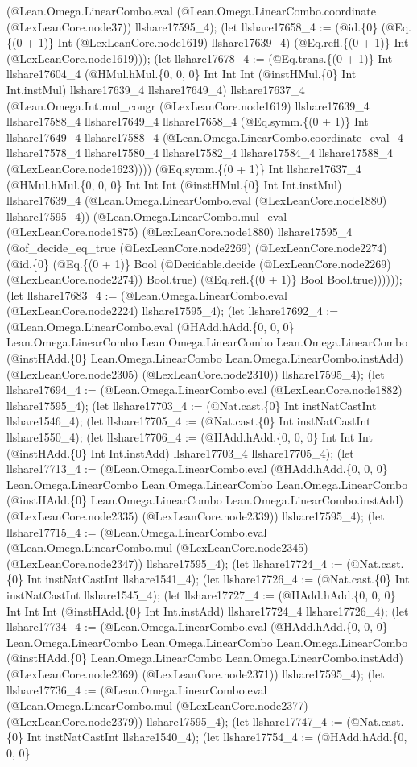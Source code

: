 \documentclass[11pt]{article}
\begin{document}
(@Lean.Omega.LinearCombo.eval (@Lean.Omega.LinearCombo.coordinate (@LexLeanCore.node37)) llshare17595\_4); (let llshare17658\_4 := (@id.\{0\} (@Eq.\{(0 + 1)\} Int (@LexLeanCore.node1619) llshare17639\_4) (@Eq.refl.\{(0 + 1)\} Int (@LexLeanCore.node1619))); (let llshare17678\_4 := (@Eq.trans.\{(0 + 1)\} Int llshare17604\_4 (@HMul.hMul.\{0, 0, 0\} Int Int Int (@instHMul.\{0\} Int Int.instMul) llshare17639\_4 llshare17649\_4) llshare17637\_4 (@Lean.Omega.Int.mul\_congr (@LexLeanCore.node1619) llshare17639\_4 llshare17588\_4 llshare17649\_4 llshare17658\_4 (@Eq.symm.\{(0 + 1)\} Int llshare17649\_4 llshare17588\_4 (@Lean.Omega.LinearCombo.coordinate\_eval\_4 llshare17578\_4 llshare17580\_4 llshare17582\_4 llshare17584\_4 llshare17588\_4 (@LexLeanCore.node1623)))) (@Eq.symm.\{(0 + 1)\} Int llshare17637\_4 (@HMul.hMul.\{0, 0, 0\} Int Int Int (@instHMul.\{0\} Int Int.instMul) llshare17639\_4 (@Lean.Omega.LinearCombo.eval (@LexLeanCore.node1880) llshare17595\_4)) (@Lean.Omega.LinearCombo.mul\_eval (@LexLeanCore.node1875) (@LexLeanCore.node1880) llshare17595\_4 (@of\_decide\_eq\_true (@LexLeanCore.node2269) (@LexLeanCore.node2274) (@id.\{0\} (@Eq.\{(0 + 1)\} Bool (@Decidable.decide (@LexLeanCore.node2269) (@LexLeanCore.node2274)) Bool.true) (@Eq.refl.\{(0 + 1)\} Bool Bool.true)))))); (let llshare17683\_4 := (@Lean.Omega.LinearCombo.eval (@LexLeanCore.node2224) llshare17595\_4); (let llshare17692\_4 := (@Lean.Omega.LinearCombo.eval (@HAdd.hAdd.\{0, 0, 0\} Lean.Omega.LinearCombo Lean.Omega.LinearCombo Lean.Omega.LinearCombo (@instHAdd.\{0\} Lean.Omega.LinearCombo Lean.Omega.LinearCombo.instAdd) (@LexLeanCore.node2305) (@LexLeanCore.node2310)) llshare17595\_4); (let llshare17694\_4 := (@Lean.Omega.LinearCombo.eval (@LexLeanCore.node1882) llshare17595\_4); (let llshare17703\_4 := (@Nat.cast.\{0\} Int instNatCastInt llshare1546\_4); (let llshare17705\_4 := (@Nat.cast.\{0\} Int instNatCastInt llshare1550\_4); (let llshare17706\_4 := (@HAdd.hAdd.\{0, 0, 0\} Int Int Int (@instHAdd.\{0\} Int Int.instAdd) llshare17703\_4 llshare17705\_4); (let llshare17713\_4 := (@Lean.Omega.LinearCombo.eval (@HAdd.hAdd.\{0, 0, 0\} Lean.Omega.LinearCombo Lean.Omega.LinearCombo Lean.Omega.LinearCombo (@instHAdd.\{0\} Lean.Omega.LinearCombo Lean.Omega.LinearCombo.instAdd) (@LexLeanCore.node2335) (@LexLeanCore.node2339)) llshare17595\_4); (let llshare17715\_4 := (@Lean.Omega.LinearCombo.eval (@Lean.Omega.LinearCombo.mul (@LexLeanCore.node2345) (@LexLeanCore.node2347)) llshare17595\_4); (let llshare17724\_4 := (@Nat.cast.\{0\} Int instNatCastInt llshare1541\_4); (let llshare17726\_4 := (@Nat.cast.\{0\} Int instNatCastInt llshare1545\_4); (let llshare17727\_4 := (@HAdd.hAdd.\{0, 0, 0\} Int Int Int (@instHAdd.\{0\} Int Int.instAdd) llshare17724\_4 llshare17726\_4); (let llshare17734\_4 := (@Lean.Omega.LinearCombo.eval (@HAdd.hAdd.\{0, 0, 0\} Lean.Omega.LinearCombo Lean.Omega.LinearCombo Lean.Omega.LinearCombo (@instHAdd.\{0\} Lean.Omega.LinearCombo Lean.Omega.LinearCombo.instAdd) (@LexLeanCore.node2369) (@LexLeanCore.node2371)) llshare17595\_4); (let llshare17736\_4 := (@Lean.Omega.LinearCombo.eval (@Lean.Omega.LinearCombo.mul (@LexLeanCore.node2377) (@LexLeanCore.node2379)) llshare17595\_4); (let llshare17747\_4 := (@Nat.cast.\{0\} Int instNatCastInt llshare1540\_4); (let llshare17754\_4 := (@HAdd.hAdd.\{0, 0, 0\} 
\end{document}
